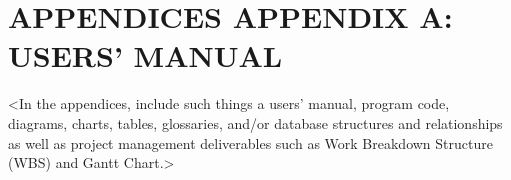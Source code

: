 \chapter[APPENDIX A: USERS’ MANUAL]{\hfill APPENDICES \hfill\null\newline\newline APPENDIX A: USERS’ MANUAL}

{\textless}In the appendices, include such things a users’ manual, program code, diagrams, charts, tables, glossaries, and/or database structures and relationships as well as project management deliverables such as Work Breakdown Structure (WBS) and Gantt Chart.{\textgreater}